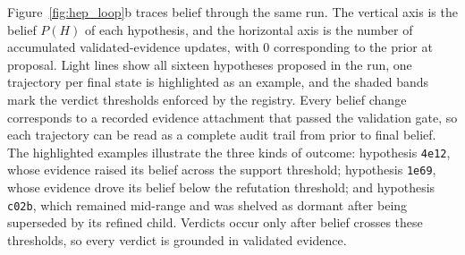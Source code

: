 Figure~\ref{fig:hep_loop}b traces belief through the same run.
The vertical axis is the belief $P(H)$ of each hypothesis, and the
horizontal axis is the number of accumulated validated-evidence updates,
with 0 corresponding to the prior at proposal.
Light lines show all sixteen hypotheses proposed in the run, one
trajectory per final state is highlighted as an example, and the
shaded bands mark the verdict thresholds enforced by the registry.
Every belief change corresponds to a recorded evidence attachment that
passed the validation gate, so each trajectory can be read as a
complete audit trail from prior to final belief.
The highlighted examples illustrate the three kinds of outcome:
hypothesis \texttt{4e12}, whose evidence raised its belief across the
support threshold; hypothesis \texttt{1e69}, whose evidence drove its
belief below the refutation threshold; and hypothesis \texttt{c02b}, which
remained mid-range and was shelved as dormant after being superseded
by its refined child.
Verdicts occur only after belief crosses these thresholds, so every
verdict is grounded in validated evidence.

